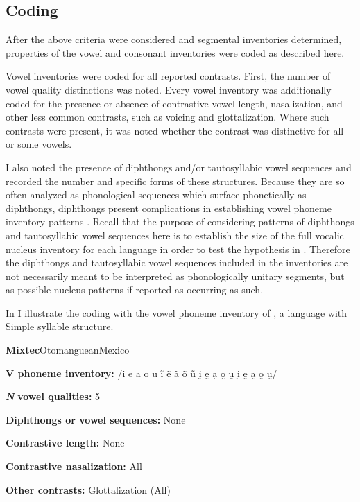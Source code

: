 \subsection{Coding}\label{sec:4.2.2}

  After the above criteria were considered and segmental inventories determined, properties of the vowel and consonant inventories were coded as described here.

  Vowel inventories were coded for all reported contrasts. First, the number of vowel quality distinctions was noted. Every vowel inventory was additionally coded for the presence or absence of contrastive vowel length, nasalization, and other less common contrasts, such as voicing and glottalization. Where such contrasts were present, it was noted whether the contrast was distinctive for all or some vowels. 

  I also noted the presence of diphthongs and/or tautosyllabic vowel sequences and recorded the number and specific forms of these structures. Because they are so often analyzed as phonological sequences which surface phonetically as diphthongs, diphthongs present complications in establishing vowel phoneme inventory patterns \citep[133]{Maddieson1984}. Recall that the purpose of considering patterns of diphthongs and tautosyllabic vowel sequences here is to establish the size of the full vocalic nucleus inventory for each language in order to test the hypothesis in . Therefore the diphthongs and tautosyllabic vowel sequences included in the inventories are not necessarily meant to be interpreted as phonologically unitary segments, but as possible nucleus patterns if reported as occurring as such.

  In  I illustrate the coding with the vowel phoneme inventory of , a language with Simple syllable structure.

\ea\label{ex:4.9}
 \textbf{Mixtec}{Otomanguean}{Mexico}

\textbf{V phoneme inventory:} /i e a o u ĩ  ẽ  ã  õ  ũ  ḭ  ḛ  a̰  o̰  ṵ ḭ ḛ  a̰  o̰  ṵ/

\textbf{\textit{N}} \textbf{vowel qualities:} 5

\textbf{Diphthongs or vowel sequences:} None

\textbf{Contrastive length:} None

\textbf{Contrastive nasalization:} All

\textbf{Other contrasts:} Glottalization (All)
\z


